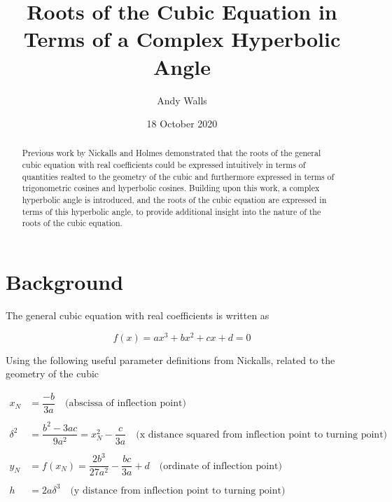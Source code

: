 \documentclass{article}
\title{Roots of the Cubic Equation in Terms of a Complex Hyperbolic Angle}
\author{Andy Walls}
\date{18 October 2020}
\begin{document}
\maketitle
\newpage


\begin{abstract}
\renewcommand{\abstractname}{Summary}
Previous work by Nickalls\cite{Nickalls1993} and Holmes\cite{Holmes2002} demonstrated that the roots of the general cubic equation with real coefficients could be expressed intuitively in terms of quantities realted to the geometry of the cubic and furthermore expressed in terms of trigonometric cosines and hyperbolic cosines.  Building upon this work, a complex hyperbolic angle is introduced, and the roots of the cubic equation are expressed in terms of this hyperbolic angle, to provide additional insight into the nature of the roots of the cubic equation.
\end{abstract}
\newpage

\tableofcontents
\newpage


\section{Background}
The general cubic equation with real coefficients is written as

\begin{equation*}
	f(x) = ax^3 + bx^2 + cx + d = 0
\end{equation*}

Using the following useful parameter definitions from Nickalls\cite{Nickalls1993}, related to the geometry of the cubic

\begin{align*}
	x_N &= \dfrac{-b}{3a} \quad \text{(abscissa of inflection point)}\\
	\\
	\delta^2 &= \dfrac{b^2-3ac}{9a^2} = x_N^2 - \dfrac{c}{3a} \quad \text{(x distance squared from inflection point to turning point)}\\
	\\
	y_N &= f(x_N) = \dfrac{2b^3}{27a^2} - \dfrac{bc}{3a} + d \quad \text{(ordinate of inflection point)}\\
	\\
	h &= 2a\delta^3 \quad \text{(y distance from inflection point to turning point)} \\
\end{align*}
\end{document}
